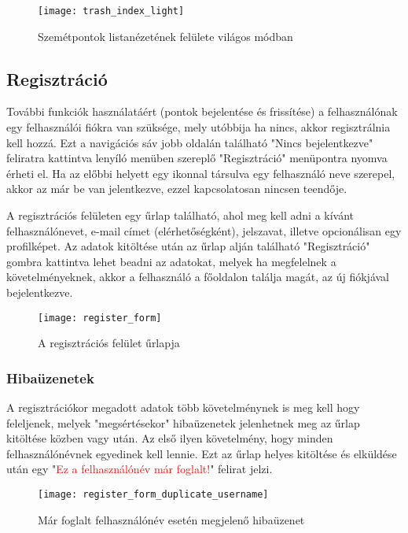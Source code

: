 \begin{figure}[H]
	\centering
	\texttt{[image: trash\_index\_light]}
	\caption{Szemétpontok listanézetének felülete világos módban}
	\label{fig:trash_index_light}
\end{figure}

\subsection{Regisztráció}

További funkciók használatáért (pontok bejelentése és frissítése) a felhasználónak egy felhasználói fiókra van szüksége, mely utóbbija ha nincs, akkor regisztrálnia kell hozzá. Ezt a navigációs sáv jobb oldalán található "Nincs bejelentkezve" feliratra kattintva lenyíló menüben szereplő "Regisztráció" menüpontra nyomva érheti el. Ha az előbbi helyett egy  ikonnal társulva egy felhasználó neve szerepel, akkor az már be van jelentkezve, ezzel kapcsolatosan nincsen teendője.\par
A regisztrációs felületen egy űrlap található, ahol meg kell adni a kívánt felhasználónevet, e-mail címet (elérhetőségként), jelszavat, illetve opcionálisan egy profilképet. Az adatok kitöltése után az űrlap alján található "Regisztráció" gombra kattintva lehet beadni az adatokat, melyek ha megfelelnek a követelményeknek, akkor a felhasználó a főoldalon találja magát, az új fiókjával bejelentkezve.

\begin{figure}[H]
	\centering
	\texttt{[image: register\_form]}
	\caption{A regisztrációs felület űrlapja}
	\label{fig:register_form}
\end{figure}

\subsubsection{Hibaüzenetek}
\label{subsubsec:user_register_errors}

A regisztrációkor megadott adatok több követelménynek is meg kell hogy feleljenek, melyek "megsértésekor" hibaüzenetek jelenhetnek meg az űrlap kitöltése közben vagy után. Az első ilyen követelmény, hogy minden felhasználónévnek egyedinek kell lennie. Ezt az űrlap helyes kitöltése és elküldése után egy "\textcolor{red}{Ez a felhasználónév már foglalt!}" felirat jelzi.

\begin{figure}[H]
	\centering
	\texttt{[image: register\_form\_duplicate\_username]}
	\caption{Már foglalt felhasználónév esetén megjelenő hibaüzenet}
	\label{fig:register_form_duplicate_username}
\end{figure}

